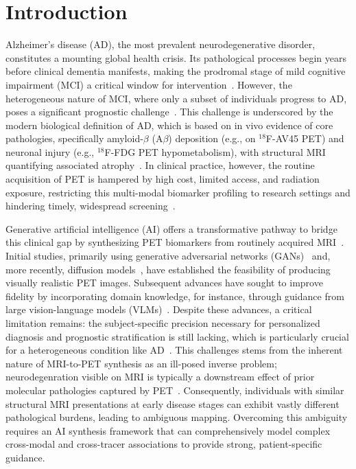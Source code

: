 \documentclass{article}
\begin{document}
\section{Introduction}
Alzheimer's disease (AD), the most prevalent neurodegenerative disorder, constitutes a mounting global health crisis. Its pathological processes begin years before clinical dementia manifests, making the prodromal stage of mild cognitive impairment (MCI) a critical window for intervention~\cite{scheltens2021alzheimer}. However, the heterogeneous nature of MCI, where only a subset of individuals progress to AD, poses a significant prognostic challenge~\cite{haller2023neuroimaging}. This challenge is underscored by the modern biological definition of AD, which is based on in vivo evidence of core pathologies, specifically amyloid-$\beta$ (A$\beta$) deposition (e.g., on $^{18}$F-AV45 PET) and neuronal injury (e.g., $^{18}$F-FDG PET hypometabolism), with structural MRI quantifying associated atrophy~\cite{ossenkoppele2022amyloid,yan2021sex,haller2023neuroimaging}. In clinical practice, however, the routine acquisition of PET is hampered by high cost, limited access, and radiation exposure, restricting this multi-modal biomarker profiling to research settings and hindering timely, widespread screening~\cite{nordberg2010use}.

Generative artificial intelligence (AI) offers a transformative pathway to bridge this clinical gap by synthesizing PET biomarkers from routinely acquired MRI~\cite{dayarathna2024deep,lee2024synthesizing}. Initial studies, primarily using generative adversarial networks (GANs)~\cite{pan2018synthesizing,pan2020spatially,apostolopoulos2022applications} and, more recently, diffusion models~\cite{xie2024synthesizing,chen2025multi,theodorou2025mri2pet}, have established the feasibility of producing visually realistic PET images. Subsequent advances have sought to improve fidelity by incorporating domain knowledge, for instance, through guidance from large vision-language models (VLMs)~\cite{wang2025unisyn,liu2025direct}.  Despite these advances, a critical limitation remains: the subject-specific precision necessary for personalized diagnosis and prognostic stratification is still lacking, which is particularly crucial for a heterogeneous condition like AD~\cite{ossenkoppele2022amyloid}. This challenges stems from the inherent nature of MRI-to-PET synthesis as an ill-posed inverse problem; neurodegenration visible on MRI is typically a downstream effect of prior molecular pathologies captured by PET~\cite{jagust2018imaging}. Consequently, individuals with similar structural MRI presentations at early disease stages can exhibit vastly different pathological burdens, leading to ambiguous mapping. Overcoming this ambiguity requires an AI synthesis framework that can comprehensively model complex cross-modal and cross-tracer associations to provide strong, patient-specific guidance.
\end{document}
